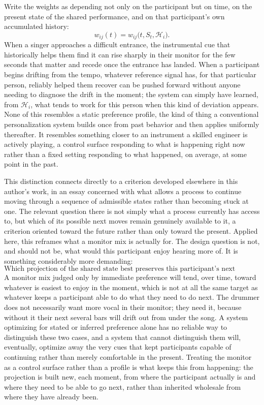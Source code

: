 \documentclass[12pt]{article}
\begin{document}
Write the weights as depending not only on the participant but on time, on the present state of the shared performance, and on that participant's own accumulated history:
\[
w_{ij}(t) = w_{ij}\bigl(t, S_t, \mathcal{H}_i\bigr).
\]
When a singer approaches a difficult entrance, the instrumental cue that historically helps them find it can rise sharply in their monitor for the few seconds that matter and recede once the entrance has landed. When a participant begins drifting from the tempo, whatever reference signal has, for that particular person, reliably helped them recover can be pushed forward without anyone needing to diagnose the drift in the moment; the system can simply have learned, from $\mathcal{H}_i$, what tends to work for this person when this kind of deviation appears. None of this resembles a static preference profile, the kind of thing a conventional personalization system builds once from past behavior and then applies uniformly thereafter. It resembles something closer to an instrument a skilled engineer is actively playing, a control surface responding to what is happening right now rather than a fixed setting responding to what happened, on average, at some point in the past.

This distinction connects directly to a criterion developed elsewhere in this author's work, in an essay concerned with what allows a process to continue moving through a sequence of admissible states rather than becoming stuck at one. The relevant question there is not simply what a process currently has access to, but which of its possible next moves remain genuinely available to it, a criterion oriented toward the future rather than only toward the present. Applied here, this reframes what a monitor mix is actually for. The design question is not, and should not be, what would this participant enjoy hearing more of. It is something considerably more demanding:
\[
\boxed{\text{Which projection of the shared state best preserves this participant's next admissible continuation?}}
\]
A monitor mix judged only by immediate preference will tend, over time, toward whatever is easiest to enjoy in the moment, which is not at all the same target as whatever keeps a participant able to do what they need to do next. The drummer does not necessarily want more vocal in their monitor; they need it, because without it their next several bars will drift out from under the song. A system optimizing for stated or inferred preference alone has no reliable way to distinguish these two cases, and a system that cannot distinguish them will, eventually, optimize away the very cues that kept participants capable of continuing rather than merely comfortable in the present. Treating the monitor as a control surface rather than a profile is what keeps this from happening: the projection is built new, each moment, from where the participant actually is and where they need to be able to go next, rather than inherited wholesale from where they have already been.
\end{document}
